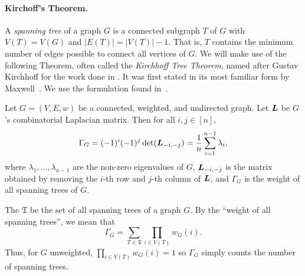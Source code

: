 \paragraph{Kirchoff's  Theorem. }
A  \emph{spanning tree} of a graph $G$ is a connected subgraph $T$ of $G$ with $V(T)=V(G)$ and $|E(T)| = |V(T)|-1$. That  is, $T$ contains the minimum number of edges possible to connect all vertices of $G$.   
We will make use  of the following Theorem, often  called the \emph{Kirchhoff Tree Theorem}, named after Gustav Kirchhoff for the work done in \cite{Kirchhoff1847}. It was first stated in its most familiar form by Maxwell~\cite{maxwell1873treatise}. We use the formulation found in~\cite{chaiken1978matrix}. 

\begin{theorem}
	\label{thm:matrix_tree_theorem}
	Let $G=(V,E,w)$ be a connected, weighted, and undirected graph. Let $\vb*{L}$ be $G$'s combinatorial Laplacian matrix. Then for all $i,j\in[n]$, 
	\[\Gamma_G = (-1)^i(-1)^j \det(\vb*{L}_{-i,-j}) = \frac{1}{n}\sum_{i=1}^{n-1} \lambda_i,\]
	where $\lambda_1,\dots,\lambda_{n-1}$ are the non-zero eigenvalues of $G$, $\vb*{L}_{-i,-j}$ is the matrix obtained by removing the $i$-th row and $j$-th column of $\vb*{L}$, and $\Gamma_G$ is the weight of all spanning trees of $G$.  
\end{theorem}

\begin{remark}
	The  $\mathfrak{T}$ be the set of all spanning trees of a graph $G$. By the ``weight of all spanning trees'', we mean that
	\begin{equation}
	\label{eq:Gamma_G}
	\Gamma_G = \sum_{T\in \mathfrak{T}} \prod_{i\in  V(T)} w_G(i).
	\end{equation}
	Thus, for $G$ unweighted, $\prod_{i\in V(T)}w_G(i)=1$ so $\Gamma_G$ simply counts the number of spanning trees. 
\end{remark}




